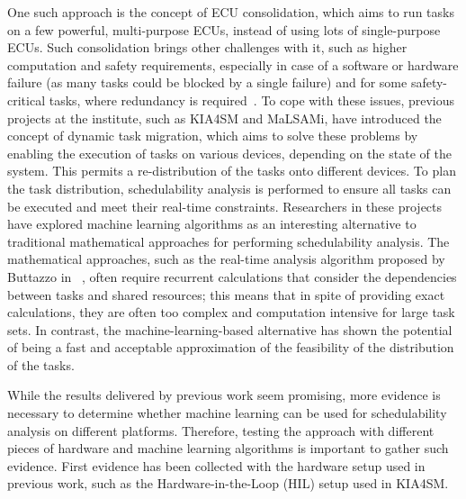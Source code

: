 One such approach is the concept of ECU consolidation, which aims to run tasks on a few powerful, multi-purpose ECUs, instead of using lots of single-purpose ECUs. Such consolidation brings other challenges with it, such as higher computation and safety requirements, especially in case of a software or hardware failure (as many tasks could be blocked by a single failure) and for some safety-critical tasks, where redundancy is required~\parencite{mundhenk1}. To cope with these issues, previous projects at the institute, such as KIA4SM and MaLSAMi, have introduced the concept of dynamic task migration, which aims to solve these problems by enabling the execution of tasks on various devices, depending on the state of the system. This permits a re-distribution of the tasks onto different devices. To plan the task distribution, schedulability analysis is performed to ensure all tasks can be executed and meet their real-time constraints. Researchers in these projects have explored machine learning algorithms as an interesting alternative to traditional mathematical approaches for performing schedulability analysis. The mathematical approaches, such as the real-time analysis algorithm proposed by Buttazzo in ~\parencite{buttazzo1}, often require recurrent calculations that consider the dependencies between tasks and shared resources; this means that in spite of providing exact calculations, they are often too complex and computation intensive for large task sets. In contrast, the machine-learning-based alternative has shown the potential of being a fast and acceptable approximation of the feasibility of the distribution of the tasks. 

While the results delivered by previous work seem promising, more evidence is necessary to determine whether machine learning can be used for schedulability analysis on different platforms. Therefore, testing the approach with different pieces of hardware and machine learning algorithms is important to gather such evidence. First evidence has been collected with the hardware setup used in previous work, such as the Hardware-in-the-Loop (HIL) setup used in KIA4SM.

